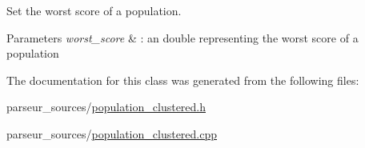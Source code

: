 Set the worst score of a population. 


\begin{DoxyParams}{Parameters}
{\em worst\+\_\+score} & \+: an double representing the worst score of a population \\
\hline
\end{DoxyParams}


The documentation for this class was generated from the following files\+:\begin{DoxyCompactItemize}
\item 
parseur\+\_\+sources/\hyperlink{population__clustered_8h}{population\+\_\+clustered.\+h}\item 
parseur\+\_\+sources/\hyperlink{population__clustered_8cpp}{population\+\_\+clustered.\+cpp}\end{DoxyCompactItemize}
